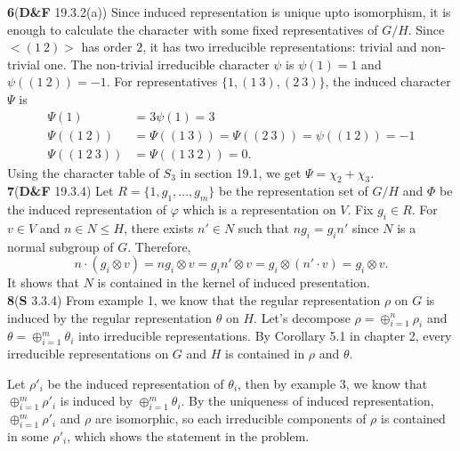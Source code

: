 \documentclass[a4paper, 12pt]{article}
\theoremstyle{Mydefinition}
\theoremstyle{Mytheorem}
\begin{document}
\noindent \textbf{6}(\textbf{D\&F} 19.3.2(a))
Since induced representation is unique upto isomorphism, it is enough to calculate the character with some fixed representatives of $G/H$. Since $<(1~2)>$ has order $2$, it has two irreducible representations: trivial and non-trivial one. The non-trivial irreducible character $\psi$ is $\psi(1)=1$ and $\psi((1~2)) = -1$. For representatives $\{1, (1~3),(2~3)\}$, the induced character $\Psi$ is
\begin{equation}
    \begin{split}
        \Psi(1) &= 3\psi(1) = 3\\
        \Psi((1~2)) &= \Psi((1~3)) = \Psi((2~3)) = \psi((1~2)) = -1\\
        \Psi((1~2~3)) &= \Psi((1~3~2)) =0.
    \end{split}
\end{equation}
Using the character table of $S_3$ in section 19.1, we get $\Psi = \chi_2+\chi_3$.\\

\noindent \textbf{7}(\textbf{D\&F} 19.3.4)
Let $R = \{1, g_1, \ldots, g_m\}$ be the representation set of $G/H$ and $\Phi$ be the induced representation of $\varphi$ which is a representation on $V$. Fix $g_i\in R$. For $v\in V$ and $n\in N\leq H$, there exists $n'\in N$ such that $ng_i = g_in'$ since $N$ is a normal subgroup of $G$. Therefore,
\begin{equation}
    n\cdot(g_i\otimes v) = ng_i\otimes v = g_in'\otimes v = g_i\otimes (n'\cdot v) =g_i\otimes v.
\end{equation}
It shows that $N$ is contained in the kernel of induced presentation.\\

\noindent \textbf{8}(\textbf{S} 3.3.4)
From example 1, we know that the regular representation $\rho$ on $G$ is induced by the regular representation $\theta$ on $H$. Let's decompose $\rho=\oplus_{i=1}^n \rho_i$ and $\theta = \oplus_{i=1}^m \theta_i$ into irreducible representations. By Corollary 5.1 in chapter 2, every irreducible representations on $G$ and $H$ is contained in $\rho$ and $\theta$.

Let $\rho'_i$ be the induced representation of $\theta_i$, then by example 3, we know that $\oplus_{i=1}^m \rho'_i$ is induced by $\oplus_{i=1}^m \theta_i$. By the uniqueness of induced representation, $\oplus_{i=1}^m \rho'_i$ and $\rho$ are isomorphic, so each irreducible components of $\rho$ is contained in some $\rho'_i$, which shows the statement in the problem.
\end{document}
